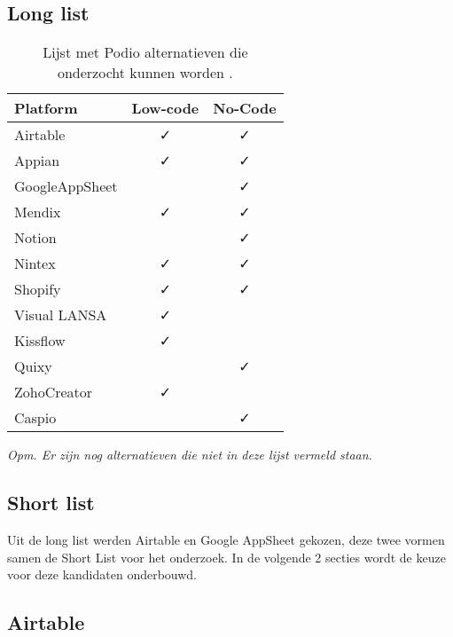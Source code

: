 \subsection{Long list}
\begin{table}[ht]
    \centering
    \caption{\label{tab:Tabel 3} Lijst met Podio alternatieven die onderzocht kunnen worden \autocite{Tasmia2022}.}
    \begin{tabular}{ | l{5cm} | c{2cm} | c{2cm} | }
        \hline
        \textbf{Platform}   & \textbf{Low-code} & \textbf{No-Code} \\
        \hline\hline
        Airtable            & ✓ & ✓ \\
        Appian              & ✓ & ✓ \\
        GoogleAppSheet      &    & ✓ \\
        Mendix              & ✓ & ✓ \\
        Notion              &    & ✓ \\
        Nintex              & ✓ & ✓ \\
        Shopify             & ✓ & ✓ \\
        Visual LANSA        & ✓ &    \\
        Kissflow            & ✓ &    \\
        Quixy               &    & ✓ \\
        ZohoCreator         & ✓ &    \\
        Caspio              &    & ✓ \\
        \hline
    \end{tabular}
    
    {\raggedright \textit{Opm. Er zijn nog alternatieven die niet in deze lijst vermeld staan.} \par}
\end{table}

\subsection{Short list}

Uit de long list werden Airtable en Google AppSheet gekozen, deze twee vormen samen de Short List voor het onderzoek. In de volgende 2 secties wordt de keuze voor deze kandidaten onderbouwd. 

\subsection{Airtable} %


